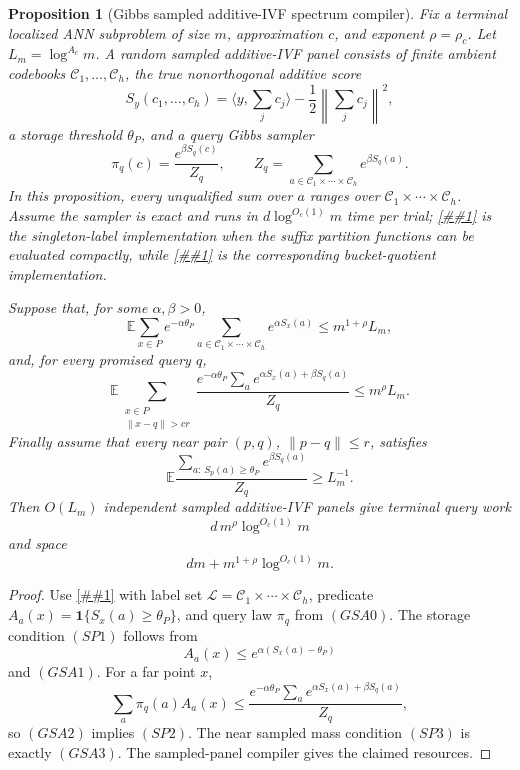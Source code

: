 \documentclass[10pt]{article}
\newcommand{\cref}[1]{\ref{##1}}
\newtheorem{proposition}[theorem]{Proposition}
\theoremstyle{definition}
\newcommand{\E}{\mathbb{E}}
\newcommand{\ip}[2]{\langle #1,#2\rangle}
\begin{document}
\begin{proposition}[Gibbs sampled additive-IVF spectrum compiler]
   \label{prop:gibbs-sampled-additive-ivf-compiler}
   Fix a terminal localized ANN subproblem of size \(m\), approximation \(c\),
   and exponent \(\rho=\rho_c\).  Let \(L_m=\log^{A_c}m\).  A random sampled
   additive-IVF panel consists of finite ambient codebooks
   \(\mathcal C_1,\ldots,\mathcal C_h\), the true nonorthogonal additive score
   \[
      S_y(c_1,\ldots,c_h)
      =
      \ip{y}{\sum_jc_j}
      -\frac12\left\|\sum_jc_j\right\|^2,
   \]
   a storage threshold \(\theta_P\), and a query Gibbs sampler
   \[
      \pi_q(c)=
      \frac{e^{\beta S_q(c)}}{Z_q},
      \qquad
      Z_q=\sum_{a\in\mathcal C_1\times\cdots\times\mathcal C_h}e^{\beta S_q(a)}.
      \tag{GSA0}
   \]
   In this proposition, every unqualified sum over \(a\) ranges over
   \(\mathcal C_1\times\cdots\times\mathcal C_h\).
   Assume the sampler is exact and runs in \(d\log^{O_c(1)}m\) time per trial;
   \cref{lem:gibbs-prefix-additive-ivf-sampler} is the singleton-label
   implementation when the suffix partition functions can be evaluated
   compactly, while \cref{lem:gibbs-aq-state-quotient} is the corresponding
   bucket-quotient implementation.

   Suppose that, for some \(\alpha,\beta>0\),
   \[
      \E
      \sum_{x\in P}
      e^{-\alpha\theta_P}
      \sum_{a\in\mathcal C_1\times\cdots\times\mathcal C_h}
      e^{\alpha S_x(a)}
      \le m^{1+\rho}L_m,
      \tag{GSA1}
   \]
   and, for every promised query \(q\),
   \[
      \E
      \sum_{\substack{x\in P\\ \|x-q\|>cr}}
      \frac{
         e^{-\alpha\theta_P}
         \sum_{a}
         e^{\alpha S_x(a)+\beta S_q(a)}
      }{Z_q}
      \le m^\rho L_m .
      \tag{GSA2}
   \]
   Finally assume that every near pair \((p,q)\), \(\|p-q\|\le r\), satisfies
   \[
      \E
      \frac{
         \sum_{a:\,S_p(a)\ge\theta_P}e^{\beta S_q(a)}
      }{Z_q}
      \ge L_m^{-1}.
      \tag{GSA3}
   \]
   Then \(O(L_m)\) independent sampled additive-IVF panels give terminal query
   work
   \[
      d\,m^\rho\log^{O_c(1)}m
   \]
   and space
   \[
      dm+m^{1+\rho}\log^{O_c(1)}m .
   \]
\end{proposition}

\begin{proof}
   Use \cref{prop:sampled-structured-panel} with label set
   \(\mathcal L=\mathcal C_1\times\cdots\times\mathcal C_h\), predicate
   \(A_a(x)=\mathbf 1\{S_x(a)\ge\theta_P\}\), and query law \(\pi_q\) from
   \((GSA0)\).  The storage condition \((SP1)\) follows from
   \[
      A_a(x)\le e^{\alpha(S_x(a)-\theta_P)}
   \]
   and \((GSA1)\).  For a far point \(x\),
   \[
      \sum_a\pi_q(a)A_a(x)
      \le
      \frac{
         e^{-\alpha\theta_P}
         \sum_a e^{\alpha S_x(a)+\beta S_q(a)}
      }{Z_q},
   \]
   so \((GSA2)\) implies \((SP2)\).  The near sampled mass condition
   \((SP3)\) is exactly \((GSA3)\).  The sampled-panel compiler gives the
   claimed resources.
\end{proof}
\end{document}
